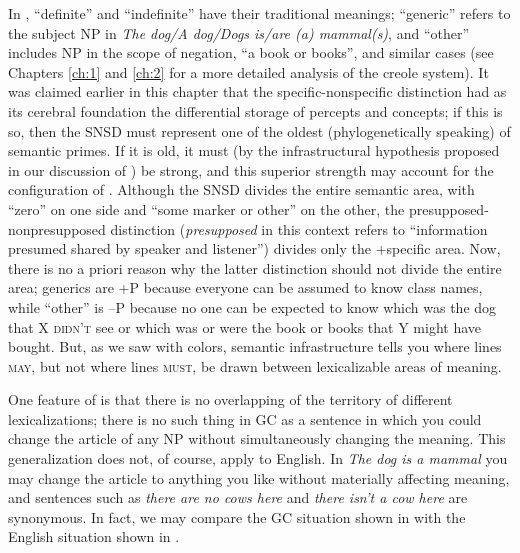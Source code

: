 

In , ``definite'' and ``indefinite'' have their traditional meanings; ``gener\-ic'' refers to the subject NP in \textit{The dog/A dog/Dogs is/are (a) mammal(s)}, and ``other'' includes NP in the scope of negation, ``a book or books'', and similar cases (see Chapters \ref{ch:1} and \ref{ch:2} for a more detailed analysis of the creole system). It was claimed earlier in this chapter that the specific-nonspecific distinction had as its cerebral foundation the differential storage of percepts and concepts; if this is so, then the SNSD must represent one of the oldest (phylogenetically speaking) of semantic primes. If it is old, it must (by the infrastructural hypothesis proposed in our discussion of ) be strong, and this superior strength may account for the configuration of . Although the SNSD divides the entire semantic area, with ``zero'' on one side and ``some marker or other'' on the other, the presupposed-nonpresupposed distinction (\textit{presupposed} in this context refers to ``information presumed shared by speaker and listener'') divides only the +specific area. Now, there is no a priori reason why the latter distinction should not divide the entire area; generics are +P because everyone can be assumed to know class names, while ``other'' is --P because no one can be expected to know which was the dog that X \textsc{didn't} see or which was or were the book or books that Y might have bought. But, as we saw with colors, semantic infrastructure tells you where lines \textsc{may}, but not where lines \textsc{must}, be drawn between lexicalizable areas of meaning.

One feature of  is that there is no overlapping of the territory of different lexicalizations; there is no such thing in GC as a sentence in which you could change the article of any NP without simultaneously changing the meaning. This generalization does not, of course, apply to English. In \textit{The dog is a mammal} you may change the article to anything you like without materially affecting meaning, and sentences such as \textit{there are no cows here} and \textit{there isn't a cow here} are synonymous. In fact, we may compare the GC situation shown in  with the English situation shown in . %

